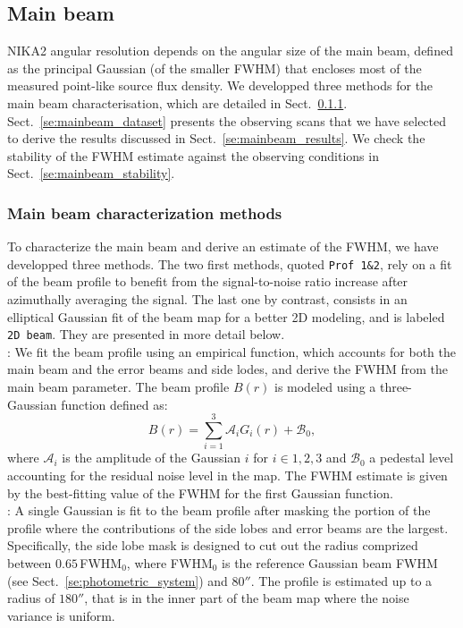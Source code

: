 \subsection{Main beam}
\label{se:mainbeam}

NIKA2 angular resolution depends on the angular size of the main beam,
defined as the principal Gaussian (of the smaller FWHM) that encloses
most of the measured point-like source flux density. We developped
three methods for the main beam characterisation, which are detailed
in Sect.~\ref{se:mainbeam_methods}. Sect.~\ref{se:mainbeam_dataset}
presents the observing scans that we have selected to derive the results
discussed in Sect.~\ref{se:mainbeam_results}. We check the stability
of the FWHM estimate against the observing conditions in
Sect.~\ref{se:mainbeam_stability}.


\subsubsection{Main beam characterization methods}
\label{se:mainbeam_methods}
To characterize the main beam and derive an estimate of the FWHM, we
have developped three methods. The two first methods, quoted
{\tt Prof 1\&2}, rely on a fit
of the beam profile to benefit from the signal-to-noise ratio increase
after azimuthally averaging the signal. The last one by contrast,
consists in an elliptical Gaussian fit of the beam map for a better
2D modeling, and is labeled {\tt 2D beam}. They are presented in more
detail below. \\

: We fit the beam profile using an empirical function,
which accounts for both the main beam and the error beams and side
lodes, and derive the FWHM from the main beam parameter. The beam
profile $B(r)$ is modeled using a three-Gaussian function defined as:
\begin{equation}
  B(r) = \sum_{i=1}^{3} \mathcal{A}_i G_i(r) + \mathcal{B}_0,
  \label{eq:3gauss}
\end{equation}
where $\mathcal{A}_i$ is the amplitude of the Gaussian $i$ for $i \in {1, 2, 3}$ and
$\mathcal{B}_0$ a pedestal level accounting for the residual noise
level in the map. The FWHM estimate is given by the best-fitting value
of the FWHM for the first Gaussian function.\\

: A single Gaussian is fit to the beam profile after
masking the portion of the profile where the contributions of the side
lobes and error beams are the largest. Specifically, the side lobe mask
is designed to cut out the radius comprized between $0.65\, $FWHM$_0$,
where FWHM$_0$ is the reference Gaussian beam FWHM (see
Sect.~\ref{se:photometric_system}) and $80''$. %
The profile is estimated up to a radius of
$180''$, that is in the inner part of the beam map where the noise
variance is uniform.\\

